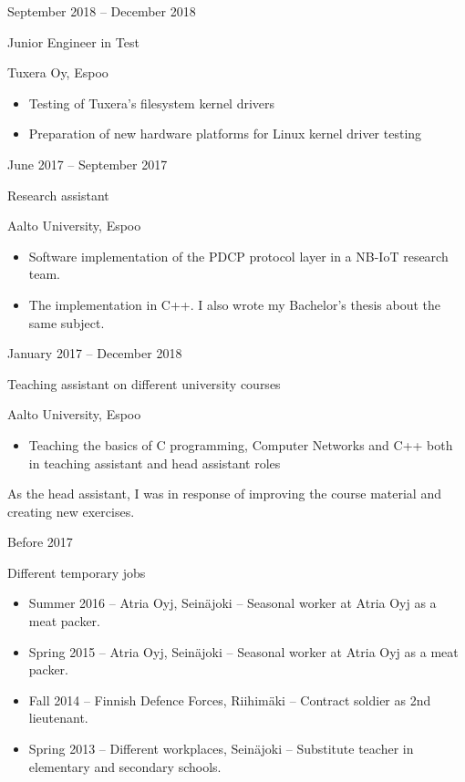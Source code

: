 \documentclass[a4paper,hidelinks,10pt]{article}
\newlength{\cvcolumngapwidth}
\newlength{\cvleftcolumnwidth}
\newlength{\cvrightcolumnwidth}
\newcommand{\cvtitlestyle}[1]{{\large\cvtitlefont\textcolor{cvtitlecolor}{#1}}}
\newcommand{\cvdurationstyle}[1]{{\small\cvdurationfont\textcolor{cvdurationcolor}{#1}}}
\newlength{\cvafteritemskipamount}
\newlength{\cvaftertitleskipamount}
\newlength{\cvparskip}
\newcommand{\cvitem}[2]{
    \begin{minipage}[t]{\cvleftcolumnwidth}
        \raggedleft #1
    \end{minipage}%
    \hspace{\cvcolumngapwidth}%
    \begin{minipage}[t]{\cvrightcolumnwidth}
        \setlength{\parskip}{\cvparskip} #2
    \end{minipage}

    \vspace{\cvafteritemskipamount}
}
\newcommand{\cvtitle}[1]{
    \cvtitlestyle{#1}

    \vspace{\cvaftertitleskipamount}
    \vspace{-\cvparskip}
}
\begin{document}
\cvitem{
    \cvdurationstyle{September  2018 -- December 2018}
}{
    \cvtitle{Junior Engineer in Test}

    Tuxera Oy, Espoo

    \begin{itemize}[leftmargin=*]
        \item Testing of Tuxera's filesystem kernel drivers
        \item Preparation of new hardware platforms for Linux kernel driver testing
    \end{itemize}
}


\cvitem{
    \cvdurationstyle{June 2017 -- September 2017}
}{
    \cvtitle{Research assistant}

    Aalto University, Espoo

    \begin{itemize}[leftmargin=*]
        \item Software implementation of the PDCP protocol layer in a NB-IoT research team.
        \item The implementation in C++. I also wrote my Bachelor's thesis about the same subject.
    \end{itemize}
}

\cvitem{
    \cvdurationstyle{January 2017 -- December 2018}
}{
    \cvtitle{Teaching assistant on different university courses}

    Aalto University, Espoo

    \begin{itemize}[leftmargin=*]
        \item Teaching the basics of C programming, Computer Networks and C++ both in teaching assistant and head assistant roles
    \end{itemize}
    
    As the head assistant, I was in response of improving the course material and creating new exercises.
}


\cvitem{
    \cvdurationstyle{Before 2017}
}{
    \cvtitle{Different temporary jobs}

    \begin{itemize}[leftmargin=*]
        \item Summer 2016 -- Atria Oyj, Seinäjoki -- Seasonal worker at Atria Oyj as a meat packer.
        \item Spring 2015 -- Atria Oyj, Seinäjoki -- Seasonal worker at Atria Oyj as a meat packer.
        \item Fall 2014 -- Finnish Defence Forces, Riihimäki -- Contract soldier as 2nd lieutenant.
        \item Spring 2013 -- Different workplaces, Seinäjoki -- Substitute teacher in elementary and secondary schools.
    \end{itemize}
}
\end{document}
